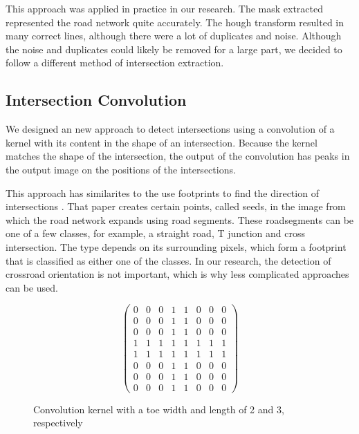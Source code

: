 This approach was applied in practice in our research. The mask extracted
represented the road network quite accurately. The hough transform resulted in
many correct lines, although there were a lot of duplicates and noise. Although
the noise and duplicates could likely be removed for a large part, we decided
to follow a different method of intersection extraction. 



\subsection{Intersection Convolution}
We designed an new approach to detect intersections using a convolution of
a kernel with its content in the shape of an intersection. Because the kernel
matches the shape of the intersection, the output of the convolution has peaks
in the output image on the positions of the intersections.

This approach has similarites to the use footprints to find the direction of
intersections \cite{hu2007road}. That paper creates certain points, called
seeds, in the image from which the road network expands using road segments.
These roadsegments can be one of a few classes, for example, a straight road,
T junction and cross intersection. The type depends on its surrounding pixels,
which form a footprint that is classified as either one of the classes. In our
research, the detection of crossroad orientation is not important, which is why
less complicated approaches can be used.

\begin{figure}
\[
 \begin{pmatrix}
 0 & 0 & 0 & 1 & 1 & 0 & 0 & 0\\
 0 & 0 & 0 & 1 & 1 & 0 & 0 & 0\\
 0 & 0 & 0 & 1 & 1 & 0 & 0 & 0\\
 1 & 1 & 1 & 1 & 1 & 1 & 1 & 1\\
 1 & 1 & 1 & 1 & 1 & 1 & 1 & 1\\
 0 & 0 & 0 & 1 & 1 & 0 & 0 & 0\\
 0 & 0 & 0 & 1 & 1 & 0 & 0 & 0\\
 0 & 0 & 0 & 1 & 1 & 0 & 0 & 0
 \end{pmatrix}
\] 
\caption{Convolution kernel with a toe width and length of 2 and 3,
respectively}
\label{fig:conv_kernel}
\end{figure}

